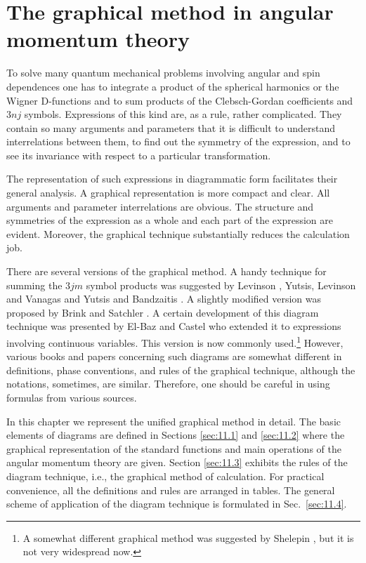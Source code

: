 \chapter{The graphical method in angular momentum theory}\label{chap:11}
To solve many quantum mechanical problems involving angular and spin dependences one has to integrate a product of the spherical harmonics or the Wigner D-functions and to sum products of the Clebsch-Gordan coefficients and \(3 n j\) symbols. Expressions of this kind are, as a rule, rather complicated. They contain so many arguments and parameters that it is difficult to understand interrelations between them, to find out the symmetry of the expression, and to see its invariance with respect to a particular transformation.

The representation of such expressions in diagrammatic form facilitates their general analysis. A graphical representation is more compact and clear. All arguments and parameter interrelations are obvious. The structure and symmetries of the expression as a whole and each part of the expression are evident. Moreover, the graphical technique substantially reduces the calculation job.

There are several versions of the graphical method. A handy technique for summing the \(3 j m\) symbol products was suggested by Levinson \cite{ref080}, Yutsis, Levinson and Vanagas \cite{ref044} and Yutsis and Bandzaitis \cite{ref045}. A slightly modified version was proposed by Brink and Satchler \cite{ref009}. A certain development of this diagram technique was presented by El-Baz and Castel \cite{ref017} who extended it to expressions involving continuous variables. This version is now commonly used.\footnote{A somewhat different graphical method was suggested by Shelepin \cite{ref105}, but it is not very widespread now.}
 However, various books and papers concerning such diagrams are somewhat different in definitions, phase conventions, and rules of the graphical technique, although the notations, sometimes, are similar. Therefore, one should be careful in using formulas from various sources.

In this chapter we represent the unified graphical method in detail. The basic elements of diagrams are defined in Sections \ref{sec:11.1} and \ref{sec:11.2} where the graphical representation of the standard functions and main operations of the angular momentum theory are given. Section \ref{sec:11.3} exhibits the rules of the diagram technique, i.e., the graphical method of calculation. For practical convenience, all the definitions and rules are arranged in tables. The general scheme of application of the diagram technique is formulated in Sec.~\ref{sec:11.4}.

